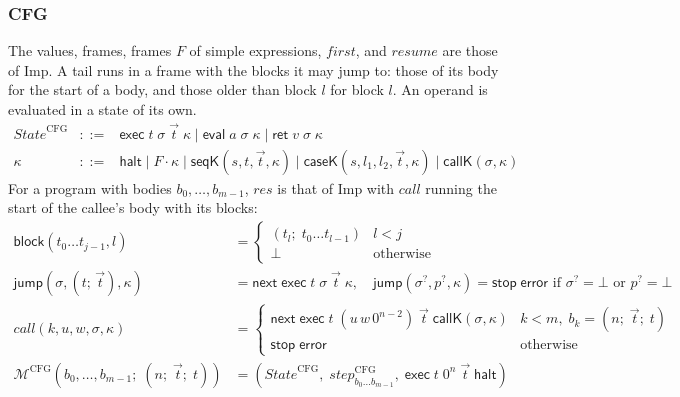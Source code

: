 \documentclass[10pt]{article}
\theoremstyle{acmplain}
\newcommand{\key}[1]{\mathsf{#1}}
\newcommand{\nxt}{\key{next}\;}
\newcommand{\stp}{\key{stop}\;}
\newcommand{\error}{\key{error}}
\newcommand{\Mach}[1]{\mathcal{M}^{#1}}
\newcommand{\step}[1]{\mathit{step}^{#1}}
\newcommand{\Kf}[2]{\key{#1}(#2)}
\newcommand{\halt}{\key{halt}}
\newcommand{\evi}[3]{\key{eval}\;#1\;#2\;#3}
\newcommand{\rti}[3]{\key{ret}\;#1\;#2\;#3}
\newcommand{\exc}[4]{\key{exec}\;#1\;#2\;#3\;#4}
\begin{document}
\subsubsection{CFG}

The values, frames, frames $F$ of simple expressions, $\mathit{first}$,
and $\mathit{resume}$ are those of Imp. A tail runs in a frame with the
blocks it may jump to: those of its body for the start of a body, and
those older than block $l$ for block $l$. An operand is evaluated in a
state of its own.
\[
\begin{array}{rcl}
  \mathit{State}^{\mathrm{CFG}} &::=& \exc{t}{\sigma}{\vec{t}}{\kappa}
    \mid \evi{a}{\sigma}{\kappa} \mid \rti{v}{\sigma}{\kappa} \\
  \kappa &::=& \halt \mid F \cdot \kappa \mid \Kf{seqK}{s, t, \vec{t}, \kappa}
    \mid \Kf{caseK}{s, l_1, l_2, \vec{t}, \kappa} \mid \Kf{callK}{\sigma, \kappa}
\end{array}
\]
For a program with bodies $b_0, \ldots, b_{m-1}$, $\mathit{res}$ is that
of Imp with $\mathit{call}$ running the start of the callee's body with its blocks:
\begin{align*}
  \key{block}(t_0 \ldots t_{j-1}, l) &=
    \begin{cases} (t_l;\; t_0 \ldots t_{l-1}) & l < j \\ \bot & \text{otherwise} \end{cases} \\
  \key{jump}(\sigma, (t;\, \vec{t}), \kappa) &= \nxt \exc{t}{\sigma}{\vec{t}}{\kappa},
    \quad \key{jump}(\sigma^?, p^?, \kappa) = \stp \error \text{ if } \sigma^? = \bot \text{ or } p^? = \bot \\
  \mathit{call}(k, u, w, \sigma, \kappa) &=
    \begin{cases}
      \nxt \exc{t}{(u\, w\, 0^{n-2})}{\vec{t}}{\Kf{callK}{\sigma, \kappa}} & k < m,\; b_k = (n;\; \vec{t};\; t) \\
      \stp \error & \text{otherwise}
    \end{cases} \\[1ex]
  \Mach{\mathrm{CFG}}(b_0, \ldots, b_{m-1};\; (n;\; \vec{t};\; t)) &=
    (\mathit{State}^{\mathrm{CFG}},\; \step{\mathrm{CFG}}_{b_0 \ldots b_{m-1}},\; \exc{t}{0^n}{\vec{t}}{\halt})
\end{align*}
\end{document}
